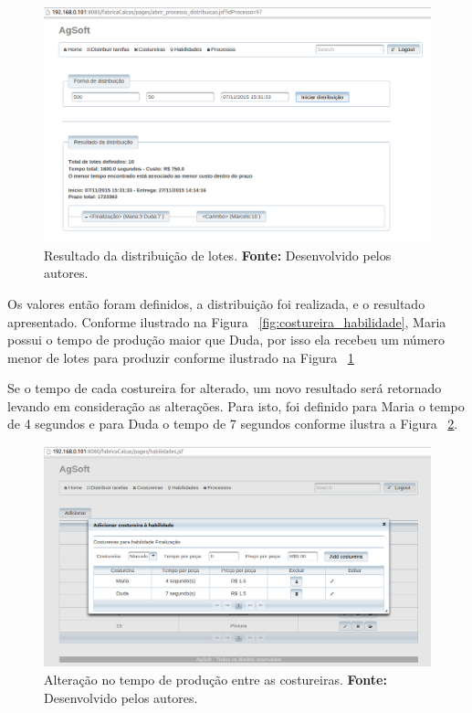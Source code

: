 \newpage

\begin{figure}[h!]
	\centerline{\includegraphics[scale=0.3]{./imagens/resultado_distribuicao_teste1.png}}
	\caption[Resultado da distribuição de lotes.]
	{Resultado da distribuição de lotes. \textbf{Fonte:} Desenvolvido pelos
	autores.}
	\label{fig:resultado_distribuicao_teste1}
\end{figure}

\par Os valores então foram definidos, a distribuição foi realizada, e o resultado apresentado. 
Conforme ilustrado na Figura ~\ref{fig:costureira_habilidade}, Maria possui
o tempo de produção maior que Duda, por isso ela recebeu um número menor de lotes
para produzir conforme ilustrado na Figura ~\ref{fig:resultado_distribuicao_teste1}

\par Se o tempo de cada costureira for alterado, um novo resultado será
retornado levando em consideração as alterações. Para isto, foi definido para
Maria o tempo de 4 segundos e para Duda o tempo de 7 segundos conforme ilustra a
Figura ~\ref{fig:tempo_costureiras}. 



\begin{figure}[h!]
	\centerline{\includegraphics[scale=0.3]{./imagens/alterando_tempo_costureira.png}}
	\caption[Alteração no tempo de produção entre as costureiras.]
	{Alteração no tempo de produção entre as costureiras. \textbf{Fonte:}
	Desenvolvido pelos autores.}
	\label{fig:tempo_costureiras}
\end{figure}


